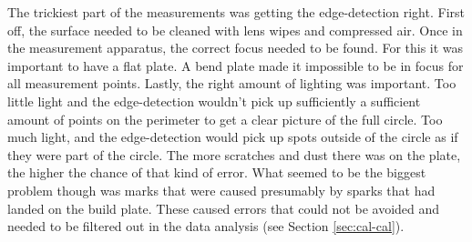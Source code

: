 The trickiest part of the measurements was getting the edge-detection right. First off, the surface needed to be cleaned with lens wipes and compressed air. Once in the measurement apparatus, the correct focus needed to be found. For this it was important to have a flat plate. A bend plate made it impossible to be in focus for all measurement points. Lastly, the right amount of lighting was important. Too little light and the edge-detection wouldn't pick up sufficiently a sufficient amount of points on the perimeter to get a clear picture of the full circle. Too much light, and the edge-detection would pick up spots outside of the circle as if they were part of the circle. The more scratches and dust there was on the plate, the higher the chance of that kind of error. What seemed to be the biggest problem though was marks that were caused presumably by sparks that had landed on the build plate. These caused errors that could not be avoided and needed to be filtered out in the data analysis (see Section \ref{sec:cal-cal}).

